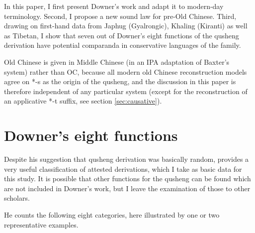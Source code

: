 \documentclass[oldfontcommands,oneside,a4paper,11pt]{article}
\newcommand{\ipa}[1]{{\phon \mbox{#1}}} %
\begin{document}
In this paper, I first present Downer's work and adapt it to modern-day terminology. Second, I propose a new sound law for pre-Old Chinese. Third, drawing on first-hand data from Japhug (Gyalrongic), Khaling (Kiranti) as well as Tibetan, I show that seven out of Downer's eight functions of the qusheng derivation have potential comparanda in conservative languages of the family.

Old Chinese is given in Middle Chinese (in an IPA adaptation of Baxter's \citeyear{baxter92} system) rather than OC, because all modern old Chinese reconstruction models agree on *\ipa{-s} as the origin of the qusheng, and the discussion in this paper is therefore independent of any particular system (except for the reconstruction of an applicative *\ipa{-t} suffix, see section \ref{sec:causative}).

\section{Downer's eight functions}
Despite his suggestion that qusheng derivation was basically random, \citet{downer59} provides a very useful classification of attested derivations, which I take as basic data for this study. It is possible that other functions for the qusheng can be found which are not included in Downer's work, but I leave the examination of those to other scholars.

He counts the following eight categories, here illustrated by one or two representative examples.
\end{document}
